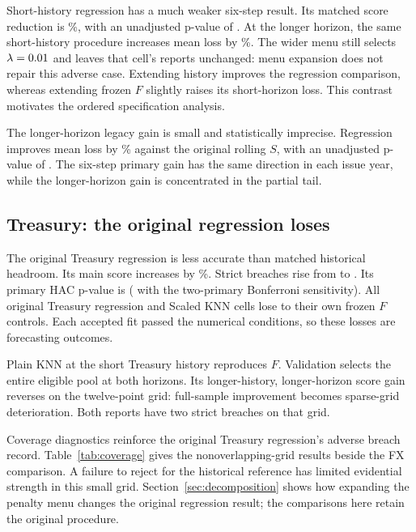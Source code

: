 

Short-history regression has a much weaker six-step result. Its matched score reduction is \FXShortGain{}\%, with an unadjusted p-value of \FXShortP{}. At the longer horizon, the same short-history procedure increases mean loss by \FXShortLongExcess{}\%. The wider menu still selects $\lambda=0.01{}$ and leaves that cell's reports unchanged: menu expansion does not repair this adverse case. Extending history improves the regression comparison, whereas extending frozen $F$ slightly raises its short-horizon loss. This contrast motivates the ordered specification analysis.

The longer-horizon legacy gain is small and statistically imprecise. Regression improves mean loss by \FXLegacyGain{}\% against the original rolling $S$, with an unadjusted p-value of \FXLegacyP{}. The six-step primary gain has the same direction in each issue year, while the longer-horizon gain is concentrated in the partial \FXTailYear{} tail.

\FloatBarrier
\subsection{Treasury: the original regression loses}
The original Treasury regression is less accurate than matched historical headroom. Its main score increases by \TreasuryOriginalExcess{}\%. Strict breaches rise from \TreasuryReferenceBreaches{} to \TreasuryOriginalBreaches{}. Its primary HAC p-value is \TreasuryPrimaryP{} (\TreasuryPrimaryBonferroni{} with the two-primary Bonferroni sensitivity). All original Treasury regression and Scaled KNN cells lose to their own frozen $F$ controls. Each accepted fit passed the numerical conditions, so these losses are forecasting outcomes.



Plain KNN at the short Treasury history reproduces $F$. Validation selects the entire eligible pool at both horizons. Its longer-history, longer-horizon score gain reverses on the twelve-point grid: full-sample improvement becomes sparse-grid deterioration. Both reports have two strict breaches on that grid.

Coverage diagnostics reinforce the original Treasury regression's adverse breach record. Table~\ref{tab:coverage} gives the nonoverlapping-grid results beside the FX comparison. A failure to reject for the historical reference has limited evidential strength in this small grid. Section~\ref{sec:decomposition} shows how expanding the penalty menu changes the original regression result; the comparisons here retain the original procedure.

